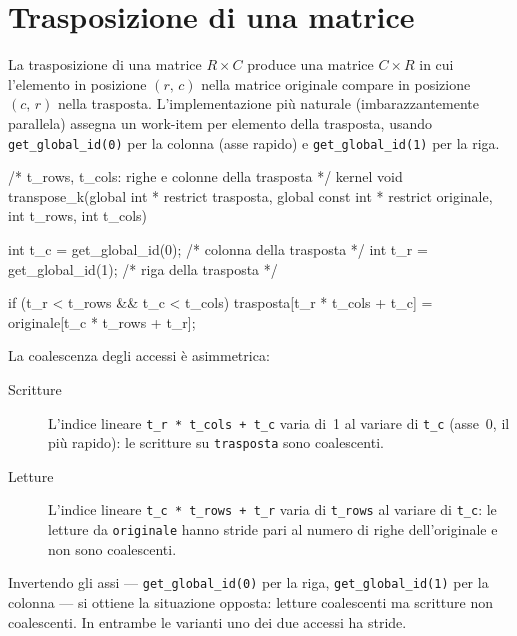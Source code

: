 \section{Trasposizione di una matrice}\label{sec:opencl_lmem_transpose}

La trasposizione di una matrice $R \times C$ produce una matrice $C \times R$ in cui l'elemento in posizione $(r,\,c)$ nella matrice originale compare in posizione $(c,\,r)$ nella trasposta. L'implementazione più naturale (imbarazzantemente parallela) assegna un work-item per elemento della trasposta, usando \texttt{get\_global\_id(0)} per la colonna (asse rapido) e \texttt{get\_global\_id(1)} per la riga.

\begin{code}[caption={Kernel naive di trasposizione}, label={code:transpose_naive}]
/* t_rows, t_cols: righe e colonne della trasposta */
kernel void transpose_k(global int * restrict trasposta,
                        global const int * restrict originale,
                        int t_rows, int t_cols)
{
    int t_c = get_global_id(0); /* colonna della trasposta */
    int t_r = get_global_id(1); /* riga della trasposta */

    if (t_r < t_rows && t_c < t_cols)
        trasposta[t_r * t_cols + t_c] = originale[t_c * t_rows + t_r];
}
\end{code}

La coalescenza degli accessi è asimmetrica:

\begin{description}
    \item[Scritture] L'indice lineare \texttt{t\_r\,*\,t\_cols\,+\,t\_c} varia di~1 al variare di \texttt{t\_c} (asse~0, il più rapido): le scritture su \texttt{trasposta} sono coalescenti.

    \item[Letture] L'indice lineare \texttt{t\_c\,*\,t\_rows\,+\,t\_r} varia di \texttt{t\_rows} al variare di \texttt{t\_c}: le letture da \texttt{originale} hanno stride pari al numero di righe dell'originale e non sono coalescenti.
\end{description}

Invertendo gli assi --- \texttt{get\_global\_id(0)} per la riga, \texttt{get\_global\_id(1)} per la colonna --- si ottiene la situazione opposta: letture coalescenti ma scritture non coalescenti. In entrambe le varianti uno dei due accessi ha stride.

